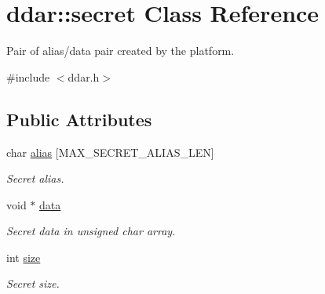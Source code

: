 \hypertarget{classddar_1_1secret}{\section{ddar\-:\-:secret \-Class \-Reference}
\label{classddar_1_1secret}
}


\-Pair of alias/data pair created by the platform.  




{\ttfamily \#include $<$ddar.\-h$>$}

\subsection*{\-Public \-Attributes}
\begin{DoxyCompactItemize}
\item 
\hypertarget{classddar_1_1secret_a26f93e8d334ce9a1a8ebfb7f8cb86dfc}{char \hyperlink{classddar_1_1secret_a26f93e8d334ce9a1a8ebfb7f8cb86dfc}{alias} \mbox{[}\-M\-A\-X\-\_\-\-S\-E\-C\-R\-E\-T\-\_\-\-A\-L\-I\-A\-S\-\_\-\-L\-E\-N\mbox{]}}\label{classddar_1_1secret_a26f93e8d334ce9a1a8ebfb7f8cb86dfc}

\begin{DoxyCompactList}\small\item\em \-Secret alias. \end{DoxyCompactList}\item 
\hypertarget{classddar_1_1secret_af031ed98d16a29772e14fc1f85d05cb3}{void $\ast$ \hyperlink{classddar_1_1secret_af031ed98d16a29772e14fc1f85d05cb3}{data}}\label{classddar_1_1secret_af031ed98d16a29772e14fc1f85d05cb3}

\begin{DoxyCompactList}\small\item\em \-Secret data in unsigned char array. \end{DoxyCompactList}\item 
\hypertarget{classddar_1_1secret_a82dfa147dee56803a254d0d98dd7a49c}{int \hyperlink{classddar_1_1secret_a82dfa147dee56803a254d0d98dd7a49c}{size}}\label{classddar_1_1secret_a82dfa147dee56803a254d0d98dd7a49c}

\begin{DoxyCompactList}\small\item\em \-Secret size. \end{DoxyCompactList}\end{DoxyCompactItemize}
